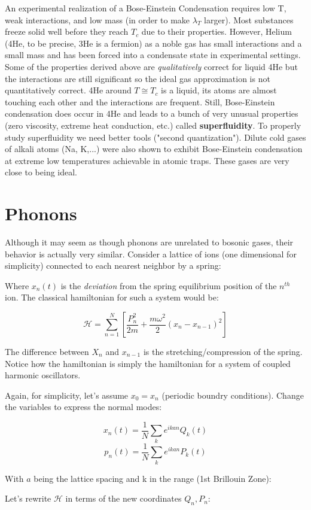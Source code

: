 \documentclass{article}
\newcommand{\sumser}[2]{\sum\limits_{#1}^{#2}}
\begin{document}
An experimental realization of a Bose-Einstein Condensation requires low T, weak interactions, and low mass (in order to make $\lambda_{T}$ larger).  Most substances freeze solid well before they reach $T_{c}$ due to their properties.  However, Helium (4He, to be precise, 3He is a fermion) as a noble gas has small interactions and a small mass and has been forced into a condensate state in experimental settings.  Some of the properties derived above are \textit{qualitatively} correct for liquid 4He but the interactions are still significant so the ideal gas approximation is not quantitatively correct.  4He around $T\cong T_{c}$ is a liquid, its atoms are almost touching each other and the interactions are frequent.  Still, Bose-Einstein condensation does occur in 4He and leads to a bunch of very unusual properties (zero viscosity, extreme heat conduction, etc.) called \textbf{superfluidity}.  To properly study superfluidity we need better tools ("second quantization").  Dilute cold gases of alkali atoms (Na, K,...) were also shown to exhibit Bose-Einstein condensation at extreme low temperatures achievable in atomic traps.  These gases are very close to being ideal.

\section{Phonons}

Although it may seem as though phonons are unrelated to bosonic gases, their behavior is actually very similar.  Consider a lattice of ions (one dimensional for simplicity) connected to each nearest neighbor by a spring:


Where $x_{n}(t)$ is the \textit{deviation} from the spring equilibrium position of the $n^{th}$ ion.  The classical hamiltonian for such a system would be:

$$\mathcal{H}=\sumser{n=1}{N}[\frac{P_{n}^{2}}{2m}+\frac{m\omega^{2}}{2}(x_{n}-x_{n-1})^{2}]$$

The difference between $X_{n}$ and $x_{n-1}$ is the stretching/compression of the spring.  Notice how the hamiltonian is simply the hamiltonian for a system of coupled harmonic oscillators.  

Again, for simplicity, let's assume $x_{0}=x_{n}$ (periodic boundry conditions).  Change the variables to express the normal modes:

$$x_{n}(t)=\frac{1}{N}\sum_{k}e^{ikan}Q_{k}(t)$$
$$p_{n}(t)=\frac{1}{N}\sum_{k}e^{ikan}P_{k}(t)$$

With $a$ being the lattice spacing and k in the range (1st Brillouin Zone):


Let's rewrite $\mathcal{H}$ in terms of the new coordinates $Q_{n},P_{n}$:
 
\end{document}
